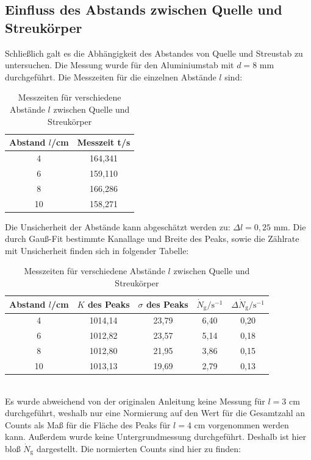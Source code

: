 \documentclass[german,  %
parskip=full,  %
]{scrartcl}
\begin{document}
\subsection{Einfluss des Abstands zwischen Quelle und Streukörper}
Schließlich galt es die Abhängigkeit des Abstandes von Quelle und Streustab zu untersuchen. Die Messung wurde für den Aluminiumstab mit $d=8$ mm durchgeführt. Die Messzeiten für die einzelnen Abstände $l$ sind:
\newpage
\begin{table}[h!]\centering
\begin{tabular}{|c|c|}\hline
Abstand $l$/cm & Messzeit t/s \\\hline
4  & 164,341	\\\hline
6   &  159,110	\\\hline
8   &  166,286	\\\hline
10   & 158,271	\\\hline
\end{tabular}
\caption{Messzeiten für verschiedene Abstände $l$ zwischen Quelle und Streukörper}
\end{table}
Die Unsicherheit der Abstände kann abgeschätzt werden zu: $\Delta l = 0,25$ mm. Die durch Gauß-Fit bestimmte Kanallage und Breite des Peaks, sowie die Zählrate mit Unsicherheit finden sich in folgender Tabelle:
\\
\begin{table}[h!]\centering
\begin{tabular}{|c|c|c|c|c|}\hline
Abstand $l$/cm & $K$ des Peaks & $\sigma$ des Peaks & $\dot{N}_{\text{g}}/\text{s}^{-1}$ &  $\Delta \dot{N}_{\text{g}}/\text{s}^{-1}$\\\hline
4  & 1014,14 & 23,79 & 6,40 & 0,20	\\\hline
6   &  1012,82 & 23,57 & 5,14 & 0,18	\\\hline
8   &  1012,80 & 21,95 & 3,86 & 0,15	\\\hline
10   & 1013,13 & 19,69 & 2,79 & 0,13	\\\hline
\end{tabular}
\caption{Messzeiten für verschiedene Abstände $l$ zwischen Quelle und Streukörper}
\end{table}
\\
Es wurde abweichend von der originalen Anleitung keine Messung für $l=3$ cm durchgeführt, weshalb nur eine Normierung auf den Wert für die Gesamtzahl an Counts als Maß für die Fläche des Peaks für $l=4$ cm vorgenommen werden kann. Außerdem wurde keine Untergrundmessung durchgeführt. Deshalb ist hier bloß $\dot{N}_{\text{g}}$ dargestellt. Die normierten Counts sind hier zu finden:
\end{document}
